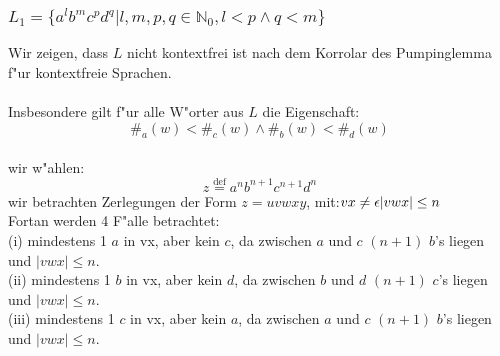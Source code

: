 \documentclass{article}
\newcommand{\eps}{\epsilon}
\newcommand{\mdef}{\overset{\text{def}}{=}}
\begin{document}
\subsubsection{$L_1 = \{a^lb^mc^pd^q | l,m,p,q \in \mathbb{N}_0, l<p \land q<m\}$}
Wir zeigen, dass $L$ nicht kontextfrei ist nach dem Korrolar des Pumpinglemma
    f"ur kontextfreie Sprachen.\\
\\
Insbesondere gilt f"ur alle W"orter aus $L$ die Eigenschaft:\[
    \#_a(w)<\#_c(w) \land \#_b(w)<\#_d(w)
\]
\\
wir w"ahlen:\[
    z \mdef a^n b^{n+1} c^{n+1} d^n
\]
wir betrachten Zerlegungen der Form $z = uvwxy$, mit:$\\
vx \neq \eps\\
|vwx| \leq n\\
$\\
Fortan werden 4 F"alle betrachtet:\\

(i) mindestens 1 $a$ in vx, aber kein $c$,
    da zwischen $a$ und $c$ $(n+1)$ $b$'s liegen und $|vwx| \leq n$.\\

(ii) mindestens 1 $b$ in vx, aber kein $d$,
    da zwischen $b$ und $d$ $(n+1)$ $c$'s liegen und $|vwx| \leq n$.\\

(iii) mindestens 1 $c$ in vx, aber kein $a$,
    da zwischen $a$ und $c$ $(n+1)$ $b$'s liegen und $|vwx| \leq n$.\\
\end{document}
